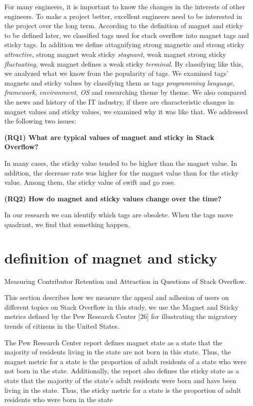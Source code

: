 \documentclass[conference]{IEEEtran}
\begin{document}
\smallskip
For many engineers, it is important to know the changes in the interests of other engineers. To make a project better, excellent engineers need to be interested in the project over the long term. According to the definition of magnet and sticky to be defined later, we classified tags used for stack overflow into magnet tags and sticky tags. In addition we define attagnifying strong magnetic and strong sticky \emph{attractive}, strong magnet weak sticky \emph{stagnant}, weak magnet strong sticky \emph{fluctuating}, weak magnet defines a weak sticky \emph{terminal}. By classifying like this, we analyzed what we know from the popularity of tags. We examined tags' magnets and sticky values by classifying them as tags \emph{programming language}, \emph{framework}, \emph{environment}, \emph{OS} and researching theme by theme. We also compared the news and history of the IT industry, if there are characteristic changes in magnet values and sticky values, we examined why it was like that. We addressed the following two issues:
\par
\smallskip

\textbf{(RQ1) What are typical values of magnet and sticky in Stack Overflow?}\par
In many cases, the sticky value tended to be higher than the magnet value. In addition, the decrease rate was higher for the magnet value than for the sticky value. Among them, the sticky value of swift and go rose.
\smallskip

\textbf{(RQ2) How do magnet and sticky values change over the time?}\par
In our research we can identify which tags are obsolete. When the tags move quadrant, we find that something happen.

\section{definition of magnet and sticky}
Measuring Contributor Retention and Attraction in Questions of Stack Overflow.

This section describes how we measure the appeal and adhesion of users on different topics on Stack Overflow in this study, we use the Magnet and Sticky metrics defined by the Pew Research Center [26] for illustrating the migratory trends of citizens in the United States.

The Pew Research Center report defines magnet state as a state that the majority of residents living in the state are not born in this state. Thus, the magnet metric for a state is the proportion of adult residents of a state who were not born in the state. Additionally, the report also defines the sticky state as a state that the majority of the state’s adult residents were born and have been living in the state. Thus, the sticky metric for a state is the proportion of adult residents who were born in the state
\end{document}
